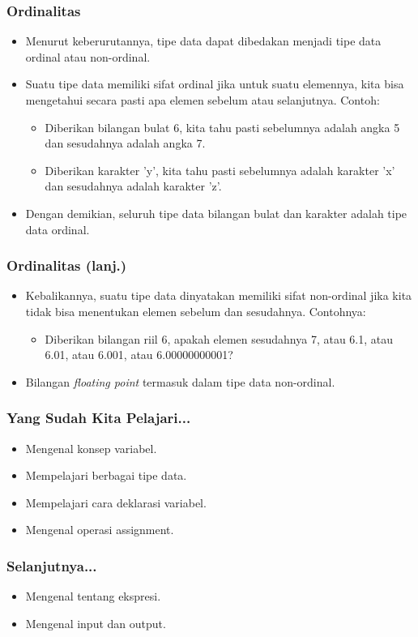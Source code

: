 \begin{frame}
\frametitle{Ordinalitas}
\begin{itemize}
  \item Menurut keberurutannya, tipe data dapat dibedakan menjadi tipe data \alert{ordinal} atau \alert{non-ordinal}.
  \item Suatu tipe data memiliki sifat ordinal jika untuk suatu elemennya, kita bisa mengetahui secara pasti apa elemen sebelum atau selanjutnya. Contoh:
  \begin{itemize}
    \item Diberikan bilangan bulat 6, kita tahu pasti sebelumnya adalah angka 5 dan sesudahnya adalah angka 7.
    \item Diberikan karakter 'y', kita tahu pasti sebelumnya adalah karakter 'x' dan sesudahnya adalah karakter 'z'.
  \end{itemize}
  \item Dengan demikian, seluruh tipe data bilangan bulat dan karakter adalah tipe data ordinal.
\end{itemize}
\end{frame}

\begin{frame}
\frametitle{Ordinalitas (lanj.)}
\begin{itemize}
  \item Kebalikannya, suatu tipe data dinyatakan memiliki sifat non-ordinal jika kita tidak bisa menentukan elemen sebelum dan sesudahnya. Contohnya:
  \begin{itemize}
    \item Diberikan bilangan riil 6, apakah elemen sesudahnya 7, atau 6.1, atau 6.01, atau 6.001, atau 6.00000000001?
  \end{itemize}
  \item Bilangan \textit{floating point} termasuk dalam tipe data non-ordinal.
\end{itemize}
\end{frame}

\begin{frame}
\frametitle{Yang Sudah Kita Pelajari...}
\begin{itemize}
  \item Mengenal konsep variabel.
  \item Mempelajari berbagai tipe data.
  \item Mempelajari cara deklarasi variabel.
  \item Mengenal operasi assignment.
\end{itemize}
\end{frame}

\begin{frame}
\frametitle{Selanjutnya...}
\begin{itemize}
  \item Mengenal tentang ekspresi.
  \item Mengenal input dan output.
\end{itemize}
\end{frame}


